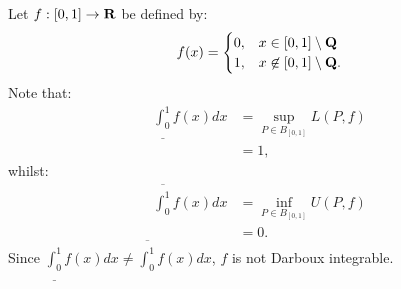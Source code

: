 \documentclass[11pt,twoside,openany]{memoir}
\begin{document}
    \begin{example}
        Let $f:[0,1] \rightarrow \mathbf{R}$ be defined by:
            \begin{equation*}
            \begin{split}
                f(x) = \begin{cases}
                    0,& x\in [0,1]\setminus\mathbf{Q} \\
                    1,& x\not\in[0,1]\setminus\mathbf{Q}.
                \end{cases}
            \end{split}
            \end{equation*}
        Note that:
            \begin{equation*}
            \begin{split}
                \underline{\int_{0}^1}f(x)dx 
                & = \sup_{P \in B_{[0,1]}}L(P,f) \\
                & = 1,
            \end{split}
            \end{equation*}
        whilst:
            \begin{equation*}
            \begin{split}
                \overline{\int_{0}^1}f(x)dx 
                & = \inf_{P \in B_{[0,1]}}U(P,f) \\
                & = 0.
            \end{split}
            \end{equation*}
        Since $\underline{\int_{0}^1}f(x)dx \neq \overline{\int_{0}^1}f(x)dx$, $f$ is not Darboux integrable.
    \end{example}
\end{document}
